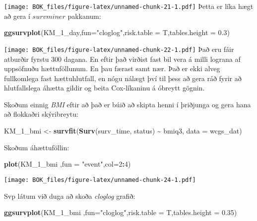 \documentclass[
]{book}
\newenvironment{Shaded}{\begin{snugshade}}{\end{snugshade}}
\newcommand{\DataTypeTok}[1]{\textcolor[rgb]{0.13,0.29,0.53}{#1}}
\newcommand{\DecValTok}[1]{\textcolor[rgb]{0.00,0.00,0.81}{#1}}
\newcommand{\FloatTok}[1]{\textcolor[rgb]{0.00,0.00,0.81}{#1}}
\newcommand{\KeywordTok}[1]{\textcolor[rgb]{0.13,0.29,0.53}{\textbf{#1}}}
\newcommand{\NormalTok}[1]{#1}
\newcommand{\OperatorTok}[1]{\textcolor[rgb]{0.81,0.36,0.00}{\textbf{#1}}}
\newcommand{\StringTok}[1]{\textcolor[rgb]{0.31,0.60,0.02}{#1}}
\begin{document}
\texttt{[image: BOK\_files/figure-latex/unnamed-chunk-21-1.pdf]}
Þetta er líka hægt að gera í \(survminer\) pakkanum:

\begin{Shaded}
\begin{Highlighting}[]
\KeywordTok{ggsurvplot}\NormalTok{(KM\_}\DecValTok{1}\NormalTok{\_day,}\DataTypeTok{fun=}\StringTok{"cloglog"}\NormalTok{,}\DataTypeTok{risk.table =}\NormalTok{ T,}\DataTypeTok{tables.height =} \FloatTok{0.3}\NormalTok{)}
\end{Highlighting}
\end{Shaded}

\texttt{[image: BOK\_files/figure-latex/unnamed-chunk-22-1.pdf]}
Það eru fáir atburðir fyrstu 300 dagana. En eftir það virðist fast bil vera á milli lograna af uppsöfnuðu hættuföllunum. En þau færast samt nær. Það er ekki alveg fullkomlega fast hættuhlutfall, en nógu nálægt því til þess að gera ráð fyrir að hlutfallslega áhætta gildir og beita Cox-líkaninu á óbreytt gögnin.

Skoðum einnig \emph{BMI} eftir að það er búið að skipta henni í þriðjunga og gera hana að flokkaðri skýribreytu:

\begin{Shaded}
\begin{Highlighting}[]
\NormalTok{KM\_}\DecValTok{1}\NormalTok{\_bmi <{-}}\StringTok{ }\KeywordTok{survfit}\NormalTok{(}\KeywordTok{Surv}\NormalTok{(surv\_time, status) }\OperatorTok{\textasciitilde{}}\StringTok{ }\NormalTok{bmiq3, }\DataTypeTok{data =}\NormalTok{ wcgs\_dat)}
\end{Highlighting}
\end{Shaded}

Skoðum áhættuföllin:

\begin{Shaded}
\begin{Highlighting}[]
\KeywordTok{plot}\NormalTok{(KM\_}\DecValTok{1}\NormalTok{\_bmi ,}\DataTypeTok{fun =} \StringTok{"event"}\NormalTok{,}\DataTypeTok{col=}\DecValTok{2}\OperatorTok{:}\DecValTok{4}\NormalTok{)}
\end{Highlighting}
\end{Shaded}

\texttt{[image: BOK\_files/figure-latex/unnamed-chunk-24-1.pdf]}

Svp látum við duga að skoða \emph{cloglog} grafið:

\begin{Shaded}
\begin{Highlighting}[]
\KeywordTok{ggsurvplot}\NormalTok{(KM\_}\DecValTok{1}\NormalTok{\_bmi ,}\DataTypeTok{fun=}\StringTok{"cloglog"}\NormalTok{,}\DataTypeTok{risk.table =}\NormalTok{ T,}\DataTypeTok{tables.height =} \FloatTok{0.35}\NormalTok{)}
\end{Highlighting}
\end{Shaded}
\end{document}
